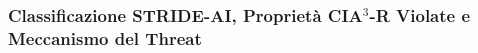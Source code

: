 \documentclass[11pt,a4paper]{article}
\begin{document}

%

\subsubsection{Classificazione STRIDE-AI, Proprietà CIA$^3$-R Violate e Meccanismo del Threat}
\end{document}

